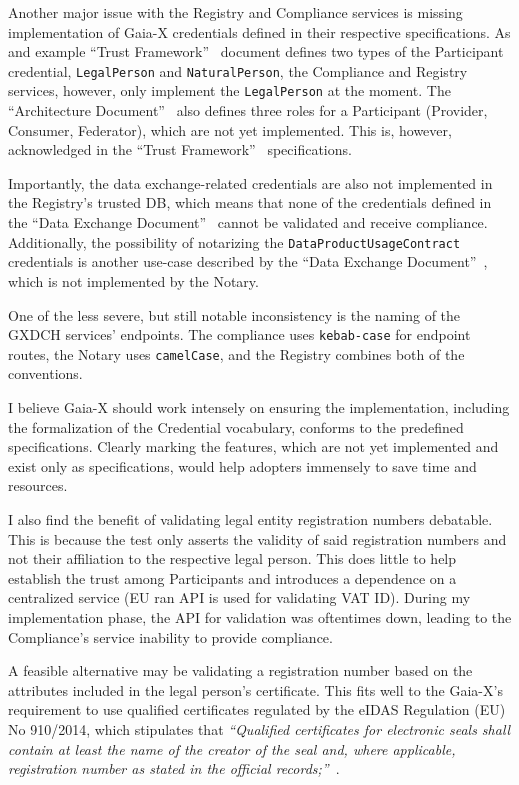 Another major issue with the Registry and Compliance services is missing implementation of Gaia-X credentials defined in their respective specifications.
As and example ``Trust Framework''~\cite{gaiax_trust_framework} document defines two types of the Participant credential, \texttt{LegalPerson} and \texttt{NaturalPerson}, the Compliance and Registry services, however, only implement the \texttt{LegalPerson} at the moment.
The ``Architecture Document''~\cite{gaiax_architecture_document} also defines three roles for a Participant (Provider, Consumer, Federator), which are not yet implemented.
This is, however, acknowledged in the ``Trust Framework''~\cite{gaiax_trust_framework} specifications.

Importantly, the data exchange-related credentials are also not implemented in the Registry's trusted DB, which means that none of the credentials defined in the ``Data Exchange Document''~\cite{gaiax_data_exchange_document} cannot be validated and receive compliance.
Additionally, the possibility of notarizing the \texttt{DataProductUsageContract} credentials is another use-case described by the ``Data Exchange Document''~\cite{gaiax_data_exchange_document}, which is not implemented by the Notary.

One of the less severe, but still notable inconsistency is the naming of the GXDCH services' endpoints.
The compliance uses \texttt{kebab-case} for endpoint routes, the Notary uses \texttt{camelCase}, and the Registry combines both of the conventions.

I believe Gaia-X should work intensely on ensuring the implementation, including the formalization of the Credential vocabulary, conforms to the predefined specifications.
Clearly marking the features, which are not yet implemented and exist only as specifications, would help adopters immensely to save time and resources.

I also find the benefit of validating legal entity registration numbers debatable.
This is because the test only asserts the validity of said registration numbers and not their affiliation to the respective legal person.
This does little to help establish the trust among Participants and introduces a dependence on a centralized service (EU ran API is used for validating VAT ID).
During my implementation phase, the API for validation was oftentimes down, leading to the Compliance's service inability to provide compliance.

A feasible alternative may be validating a registration number based on the attributes included in the legal person's certificate.
This fits well to the Gaia-X's requirement to use qualified certificates regulated by the eIDAS Regulation (EU) No 910/2014, which stipulates that \textit{``Qualified certificates for electronic seals shall contain at least the name of the creator of the seal and, where applicable, registration number as stated in the official records;''}~\cite{eidas}.

